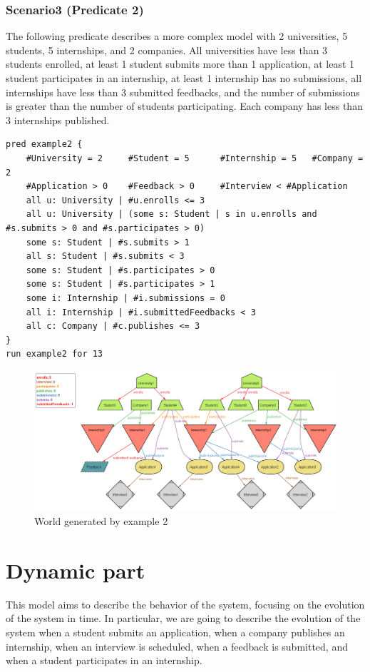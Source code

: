 \subsubsection{Scenario3 (Predicate 2)}
The following predicate describes a more complex model with 2 universities, 5 students, 5 internships, and 2 companies.
All universities have less than 3 students enrolled, at least 1 student submits more than 1 application, 
at least 1 student participates in an internship, at least 1 internship has no submissions,
all internships have less than 3 submitted feedbacks, and the number of submissions is greater than the 
number of students participating. Each company has less than 3 internships published.
\begin{lstlisting}
pred example2 {
    #University = 2     #Student = 5      #Internship = 5   #Company = 2
    #Application > 0    #Feedback > 0     #Interview < #Application
    all u: University | #u.enrolls <= 3
    all u: University | (some s: Student | s in u.enrolls and #s.submits > 0 and #s.participates > 0)
    some s: Student | #s.submits > 1
    all s: Student | #s.submits < 3
    some s: Student | #s.participates > 0
    some s: Student | #s.participates > 1
    some i: Internship | #i.submissions = 0
    all i: Internship | #i.submittedFeedbacks < 3
    all c: Company | #c.publishes <= 3
}
run example2 for 13
\end{lstlisting}
\begin{figure}[H]
    \centering
    \includegraphics[width=1\textwidth]{Images/Alloy/example2.png}
    \caption{World generated by example 2}\label{fig:example2}
\end{figure}


\section{Dynamic part}
This model aims to describe the behavior of the system, focusing on the evolution of the system in time. In particular, we are going to
describe the evolution of the system when a student submits an application, when a company publishes an internship, when an interview is scheduled,
when a feedback is submitted, and when a student participates in an internship.

